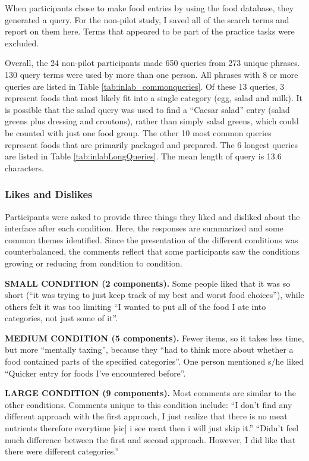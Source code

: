When participants chose to make food entries by using the food database, they generated a query. For the non-pilot study, I saved all of the search terms and report on them here. Terms that appeared to be part of the practice tasks were excluded. 

Overall, the 24 non-pilot participants made 650 queries from 273 unique phrases. 130 query terms were used by more than one person. All phrases with 8 or more queries are listed in Table \ref{tab:inlab_commonqueries}. Of these 13 queries, 3 represent foods that most likely fit into a single category (egg, salad and milk). It is possible that the salad query was used to find a ``Caesar salad'' entry (salad greens plus dressing and croutons), rather than simply salad greens, which could be counted with just one food group. The other 10 most common queries represent foods that are primarily packaged and prepared. The 6 longest queries are listed in Table \ref{tab:inlabLongQueries}. The mean length of query is 13.6 characters. 

\subsubsection{Likes and Dislikes}
Participants were asked to provide three things they liked and disliked about the interface after each condition. Here, the responses are summarized and some common themes identified. Since the presentation of the different conditions was counterbalanced, the comments reflect that some participants saw the conditions growing or reducing from condition to condition. 

\textbf{SMALL CONDITION (2 components).}
Some people liked that it was so short (``it was trying to just keep track of my best and worst food choices''), while others felt it was too limiting ``I wanted to put all of the food I ate into categories, not just some of it''. 

\textbf{MEDIUM CONDITION (5 components).}
Fewer items, so it takes less time, but more ``mentally taxing'', because they ``had to think more about whether a food contained parts of the specified categories''. One person mentioned s/he liked ``Quicker entry for foods I've encountered before''. 

\textbf{LARGE CONDITION (9 components).}
Most comments are similar to the other conditions. Comments unique to this condition include: ``I don't find any different approach with the first approach, I just realize that there is no meat nutrients therefore everytime [sic] i see meat then i will just skip it.'' ``Didn't feel much difference between the first and second approach. However, I did like that there were different categories.''

